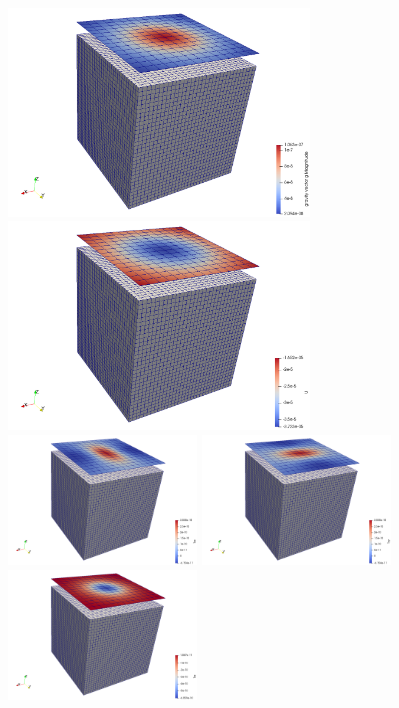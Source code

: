 \begin{center}
\includegraphics[width=8cm]{python_codes/fieldstone_84/cube/g}
\includegraphics[width=8cm]{python_codes/fieldstone_84/cube/U}\\
\includegraphics[width=5cm]{python_codes/fieldstone_84/cube/Txx}
\includegraphics[width=5cm]{python_codes/fieldstone_84/cube/Tyy}
\includegraphics[width=5cm]{python_codes/fieldstone_84/cube/Tzz}\\

\end{center}

